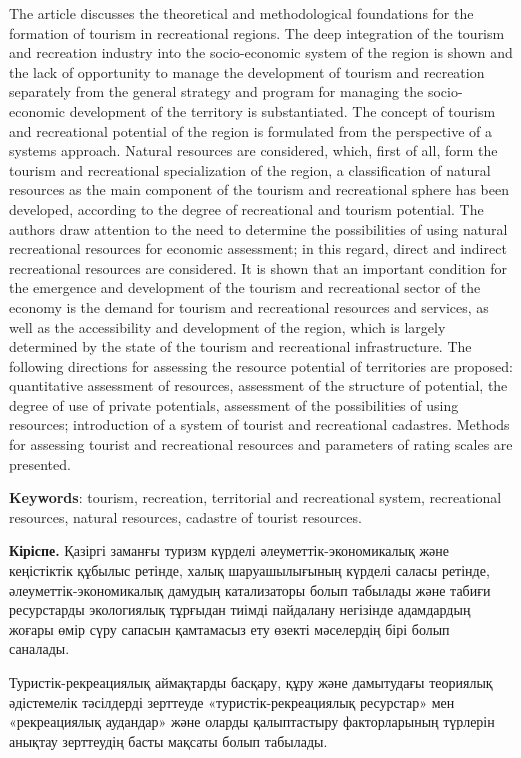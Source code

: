 The article discusses the theoretical and methodological foundations for
the formation of tourism in recreational regions. The deep integration
of the tourism and recreation industry into the socio-economic system of
the region is shown and the lack of opportunity to manage the
development of tourism and recreation separately from the general
strategy and program for managing the socio-economic development of the
territory is substantiated. The concept of tourism and recreational
potential of the region is formulated from the perspective of a systems
approach. Natural resources are considered, which, first of all, form
the tourism and recreational specialization of the region, a
classification of natural resources as the main component of the tourism
and recreational sphere has been developed, according to the degree of
recreational and tourism potential. The authors draw attention to the
need to determine the possibilities of using natural recreational
resources for economic assessment; in this regard, direct and indirect
recreational resources are considered. It is shown that an important
condition for the emergence and development of the tourism and
recreational sector of the economy is the demand for tourism and
recreational resources and services, as well as the accessibility and
development of the region, which is largely determined by the state of
the tourism and recreational infrastructure. The following directions
for assessing the resource potential of territories are proposed:
quantitative assessment of resources, assessment of the structure of
potential, the degree of use of private potentials, assessment of the
possibilities of using resources; introduction of a system of tourist
and recreational cadastres. Methods for assessing tourist and
recreational resources and parameters of rating scales are presented.

{\bfseries Keywords}: tourism, recreation, territorial and recreational
system, recreational resources, natural resources, cadastre of tourist
resources.

{\bfseries Кіріспе.} Қазіргі заманғы туризм күрделі әлеуметтік-экономикалық
және кеңістіктік құбылыс ретінде, халық шаруашылығының күрделі саласы
ретінде, әлеуметтік-экономикалық дамудың катализаторы болып табылады
және табиғи ресурстарды экологиялық тұрғыдан тиімді пайдалану негізінде
адамдардың жоғары өмір сүру сапасын қамтамасыз ету өзекті мәселердің
бірі болып саналады.

Туристік-рекреациялық аймақтарды басқару, құру және дамытудағы теориялық
әдістемелік тәсілдерді зерттеуде «туристік-рекреациялық ресурстар» мен
«рекреациялық аудандар» және оларды қалыптастыру факторларының түрлерін
анықтау зерттеудің басты мақсаты болып табылады.

